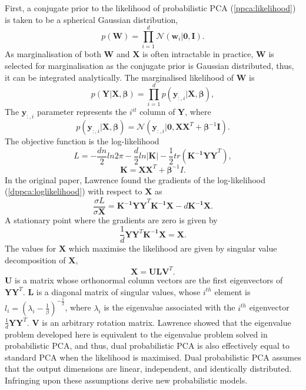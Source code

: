 \documentclass[ %
author={Dillon Keith Diep},
supervisor={Dr. Carl Henrik Ek},
degree={MEng},
title={ART-CG Hair:},
subtitle={Assisted Real-time Content Generation of Stylised Virtual Hair},
type={Research},
year={2017} ]{dissertation}
\begin{document}
	First, a conjugate prior to the likelihood of probabilistic PCA (\ref{ppca:likelihood}) is taken to be a spherical Gaussian distribution,
	$$p(\bm{W})=\prod^d_{i=1}\mathcal{N}(\bm{w}_i|\bm{0,I}).$$
	As marginalisation of both $\bm{W}$ and $\bm{X}$ is often intractable in practice, $\bm{W}$ is selected for marginalisation as the conjugate prior is Gaussian distributed, thus, it can be integrated analytically.
	The marginalised likelihood of $\bm{W}$ is
	$$p(\bm{Y|X},\bm{\beta})=\prod^d_{i=1}p(\bm{y}_{:,i}|\bm{X},\bm{\beta}),$$
	The $\bm{y}_{:,i}$ parameter represents the $i^{it}$ column of $\bm{Y}$, where
	\begin{equation} \label{gplvm:marginal}
	p(\bm{y}_{:,i}|\bm{X},\bm{\beta})=\mathcal{N}(\bm{y}_{:,i}|\bm{0,XX}^T+\bm{\beta}^{-1}\bm{I}).
	\end{equation}
	The objective function is the log-likelihood
	\begin{equation} \label{dppca:loglikelihood}
	L=-\frac{dn}{2}ln2\pi-\frac{d}{2}ln|\bm{K}|-\frac{1}{2}tr(\bm{K^{-1}YY}^T),
	\end{equation}
	$$\bm{K=XX}^T+\bm{\beta}^{-1}I.$$
	In the original paper, Lawrence found the gradients of the log-likelihood (\ref{dppca:loglikelihood}) with respect to $\bm{X}$ as
	$$\frac{\sigma L}{\sigma \bm{X}}=\bm{K^{-1}YY}^T\bm{K^{-1}X}-d\bm{K^{-1}X}.$$ 
	A stationary point where the gradients are zero is given by
	$$\frac{1}{d}\bm{YY}^T\bm{K^{-1}X=X}.$$
	The values for $\bm{X}$ which maximise the likelihood are given by singular value decomposition of $\bm{X}$,
	$$\bm{X=ULV}^T.$$
	$\bm{U}$ is a matrix whose orthonormal column vectors are the first eigenvectors of $\bm{YY}^T$. $\bm{L}$ is a diagonal matrix of singular values, whose $i^{th}$ element is $l_i=(\lambda_i-\frac{1}{\beta})^{-\frac{1}{2}}$, where $\lambda_i$ is the eigenvalue associated with the $i^{th}$ eigenvector $\frac{1}{d}\bm{YY}^T$. $\bm{V}$ is an arbitrary rotation matrix. Lawrence showed that the eigenvalue problem developed here is equivalent to the eigenvalue problem solved in probabilistic PCA, and thus, dual probabilistic PCA is also effectively equal to standard PCA when the likelihood is maximised.
	Dual probabilistic PCA assumes that the output dimensions are linear, independent, and identically distributed. Infringing upon these assumptions derive new probabilistic models.
	
\end{document}
